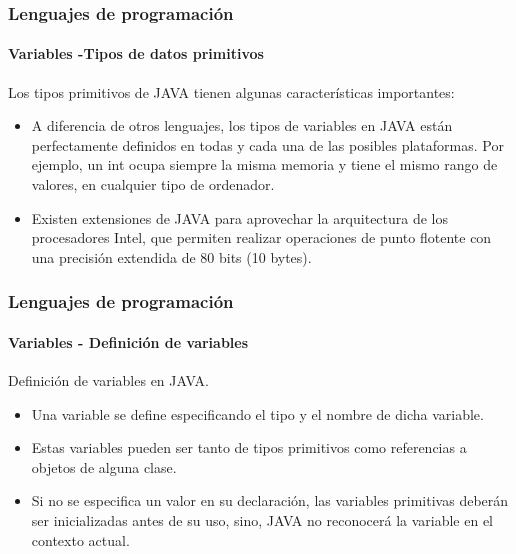 \documentclass{beamer}
\begin{document}
\begin{frame}
  \frametitle{Lenguajes de programación} 
  \framesubtitle{Variables -Tipos de datos primitivos}

  Los tipos primitivos de JAVA tienen algunas características importantes:

  \begin{itemize}
  \item A diferencia de otros lenguajes, los tipos de variables en JAVA están perfectamente definidos en todas y cada una de las posibles plataformas. Por ejemplo, un int ocupa siempre la misma memoria y tiene el mismo rango de valores, en cualquier tipo de ordenador.
  \item Existen extensiones de JAVA para aprovechar la arquitectura de los procesadores Intel, que permiten realizar operaciones de punto flotente con una precisión extendida de 80 bits (10 bytes).
  \end{itemize}
\end{frame}

\begin{frame}
  \frametitle{Lenguajes de programación} 
  \framesubtitle{Variables - Definición de variables}

  Definición de variables en JAVA.

  \begin{itemize}
  \item Una variable se define especificando el tipo y el nombre de dicha variable.
  \item Estas variables pueden ser tanto de tipos primitivos como referencias a objetos de alguna clase.
  \item Si no se especifica un valor en su declaración, las variables primitivas deberán ser inicializadas antes de su uso, sino, JAVA no reconocerá la variable en el contexto actual.
  \end{itemize}
\end{frame}
\end{document}
